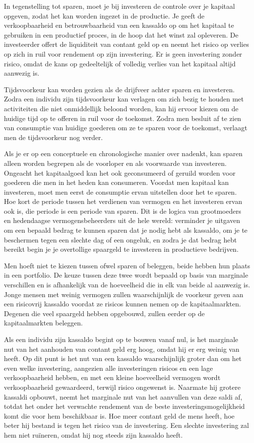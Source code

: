 \documentclass[
  a5paper,
  smalldemyvopaper,11pt,twoside,onecolumn,openright,extrafontsizes,
hidelinks]{memoir}
\begin{document}
In tegenstelling tot sparen, moet je bij investeren de controle over je
kapitaal opgeven, zodat het kan worden ingezet in de productie. Je geeft
de verkoopbaarheid en betrouwbaarheid van een kassaldo op om het
kapitaal te gebruiken in een productief proces, in de hoop dat het winst
zal opleveren. De investeerder offert de liquiditeit van contant geld op
en neemt het risico op verlies op zich in ruil voor rendement op zijn
investering. Er is geen investering zonder risico, omdat de kans op
gedeeltelijk of volledig verlies van het kapitaal altijd aanwezig is.

Tijdsvoorkeur kan worden gezien als de drijfveer achter sparen en
investeren. Zodra een individu zijn tijdsvoorkeur kan verlagen om zich
bezig te houden met activiteiten die niet onmiddellijk beloond worden,
kan hij ervoor kiezen om de huidige tijd op te offeren in ruil voor de
toekomst. Zodra men besluit af te zien van consumptie van huidige
goederen om ze te sparen voor de toekomst, verlaagt men de tijdsvoorkeur
nog verder.

Als je er op een conceptuele en chronologische manier over nadenkt, kan
sparen alleen worden begrepen als de voorloper en als voorwaarde van
investeren. Ongeacht het kapitaalgoed kan het ook geconsumeerd of
geruild worden voor goederen die men in het heden kan consumeren.
Voordat men kapitaal kan investeren, moet men eerst de consumptie ervan
uitstellen door het te sparen. Hoe kort de periode tussen het verdienen
van vermogen en het investeren ervan ook is, die periode is een periode
van sparen. Dit is de logica van grootmoeders en hedendaagse
vermogensbeheerders uit de hele wereld: verminder je uitgaven om een
bepaald bedrag te kunnen sparen dat je nodig hebt als kassaldo, om je te
beschermen tegen een slechte dag of een ongeluk, en zodra je dat bedrag
hebt bereikt begin je je overtollige spaargeld te investeren in
productieve bedrijven.

Men hoeft niet te kiezen tussen ofwel sparen of beleggen, beide hebben
hun plaats in een portfolio. De keuze tussen deze twee wordt bepaald op
basis van marginale verschillen en is afhankelijk van de hoeveelheid die
in elk van beide al aanwezig is. Jonge mensen met weinig vermogen zullen
waarschijnlijk de voorkeur geven aan een risicovrij kassaldo voordat ze
risicos kunnen nemen op de kapitaalmarkten. Degenen die veel spaargeld
hebben opgebouwd, zullen eerder op de kapitaalmarkten beleggen.

Als een individu zijn kassaldo begint op te bouwen vanaf nul, is het
marginale nut van het aanhouden van contant geld erg hoog, omdat hij er
erg weinig van heeft. Op dit punt is het nut van een kassaldo
waarschijnlijk groter dan om het even welke investering, aangezien alle
investeringen risicos en een lage verkoopbaarheid hebben, en met een
kleine hoeveelheid vermogen wordt verkoopbaarheid gewaardeerd, terwijl
risico ongewenst is. Naarmate hij grotere kassaldi opbouwt, neemt het
marginale nut van het aanvullen van deze saldi af, totdat het onder het
verwachte rendement van de beste investeringsmogelijkheid komt die voor
hem beschikbaar is. Hoe meer contant geld de mens heeft, hoe beter hij
bestand is tegen het risico van de investering. Een slechte investering
zal hem niet ruïneren, omdat hij nog steeds zijn kassaldo heeft.
\end{document}
